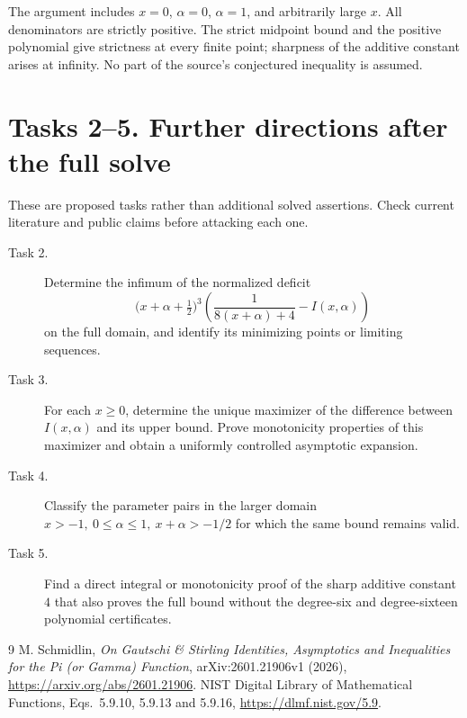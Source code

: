 \documentclass[11pt]{article}
\begin{document}
The argument includes \(x=0\), \(\alpha=0\), \(\alpha=1\), and
arbitrarily large \(x\). All denominators are strictly positive.
The strict midpoint bound and the positive polynomial give strictness
at every finite point; sharpness of the additive constant arises at
infinity. No part of the source's conjectured inequality is assumed.

\section*{Tasks 2--5. Further directions after the full solve}
These are proposed tasks rather than additional solved assertions.
Check current literature and public claims before attacking each one.
\begin{description}
\item[Task 2.] Determine the infimum of the normalized deficit
\[
 \bigl(x+\alpha+\tfrac12\bigr)^3
 \left(\frac1{8(x+\alpha)+4}-I(x,\alpha)\right)
\]
on the full domain, and identify its minimizing points or limiting
sequences.
\item[Task 3.] For each \(x\geq0\), determine the unique maximizer
of the difference between \(I(x,\alpha)\) and its upper bound.
Prove monotonicity properties of this maximizer and obtain a
uniformly controlled asymptotic expansion.
\item[Task 4.] Classify the parameter pairs in the larger domain
\(x>-1,\ 0\leq\alpha\leq1,\ x+\alpha>-1/2\) for which the same
bound remains valid.
\item[Task 5.] Find a direct integral or monotonicity proof of the
sharp additive constant \(4\) that also proves the full bound
without the degree-six and degree-sixteen polynomial certificates.
\end{description}

\begin{thebibliography}{9}
M. Schmidlin, \emph{On Gautschi \& Stirling Identities, Asymptotics
and Inequalities for the Pi (or Gamma) Function},
arXiv:2601.21906v1 (2026),
\url{https://arxiv.org/abs/2601.21906}.
NIST Digital Library of Mathematical Functions,
Eqs.~5.9.10, 5.9.13 and 5.9.16,
\url{https://dlmf.nist.gov/5.9}.
\end{thebibliography}
\end{document}
